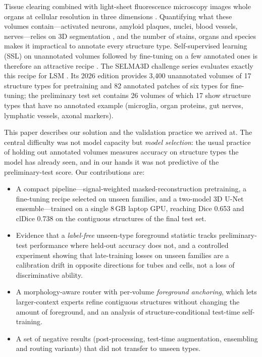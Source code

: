 \documentclass[11pt,a4paper]{article}
\begin{document}
Tissue clearing combined with light-sheet fluorescence microscopy images whole organs at cellular resolution in three dimensions \cite{erturk2012disco,ueda2020clearing}. Quantifying what these volumes contain---activated neurons, amyloid plaques, nuclei, blood vessels, nerves---relies on 3D segmentation \cite{renier2016clearmap,todorov2020vessap}, and the number of stains, organs and species makes it impractical to annotate every structure type. Self-supervised learning (SSL) on unannotated volumes followed by fine-tuning on a few annotated ones is therefore an attractive recipe \cite{zhou2021modelsgenesis,tang2022swinunetr,he2022mae}. The SELMA3D challenge series evaluates exactly this recipe for LSM \cite{chen2025selma3d}. Its 2026 edition \cite{selma3d2026design} provides 3,400 unannotated volumes of 17 structure types for pretraining and 82 annotated patches of six types for fine-tuning; the preliminary test set contains 26 volumes of which 17 show structure types that have no annotated example (microglia, organ proteins, gut nerves, lymphatic vessels, axonal markers).

This paper describes our solution and the validation practice we arrived at. The central difficulty was not model capacity but \emph{model selection}: the usual practice of holding out annotated volumes measures accuracy on structure types the model has already seen, and in our hands it was not predictive of the preliminary-test score. Our contributions are:
\begin{itemize}
  \item A compact pipeline---signal-weighted masked-reconstruction pretraining, a fine-tuning recipe selected on unseen families, and a two-model 3D U-Net ensemble---trained on a single 8\,GB laptop GPU, reaching Dice 0.653 and clDice 0.738 on the contiguous structures of the final test set.
  \item Evidence that a \emph{label-free} unseen-type foreground statistic tracks preliminary-test performance where held-out accuracy does not, and a controlled experiment showing that late-training losses on unseen families are a calibration drift in opposite directions for tubes and cells, not a loss of discriminative ability.
  \item A morphology-aware router with per-volume \emph{foreground anchoring}, which lets larger-context experts refine contiguous structures without changing the amount of foreground, and an analysis of structure-conditional test-time self-training.
  \item A set of negative results (post-processing, test-time augmentation, ensembling and routing variants) that did not transfer to unseen types.
\end{itemize}
\end{document}
